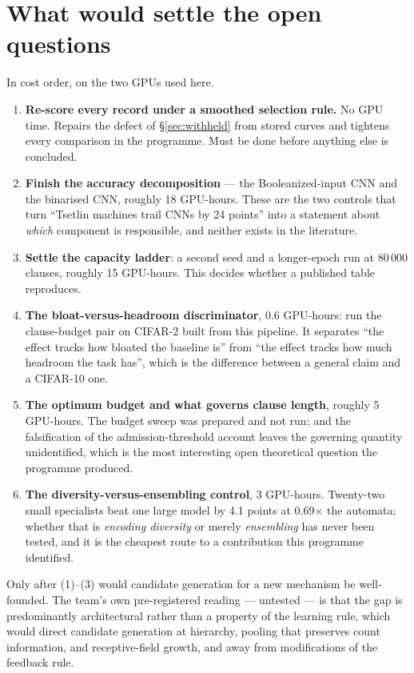 \section{What would settle the open questions}

In cost order, on the two GPUs used here.

\begin{enumerate}
\item \textbf{Re-score every record under a smoothed selection rule.} No GPU time. Repairs the defect
      of \S\ref{sec:withheld} from stored curves and tightens every comparison in the programme.
      Must be done before anything else is concluded.
\item \textbf{Finish the accuracy decomposition} --- the Booleanized-input CNN and the binarised CNN,
      roughly 18 GPU-hours. These are the two controls that turn ``Tsetlin machines trail CNNs by 24
      points'' into a statement about \emph{which} component is responsible, and neither exists in the
      literature.
\item \textbf{Settle the capacity ladder}: a second seed and a longer-epoch run at 80\,000 clauses,
      roughly 15 GPU-hours. This decides whether a published table reproduces.
\item \textbf{The bloat-versus-headroom discriminator}, 0.6 GPU-hours: run the clause-budget pair on
      CIFAR-2 built from this pipeline. It separates ``the effect tracks how bloated the baseline is''
      from ``the effect tracks how much headroom the task has'', which is the difference between a
      general claim and a CIFAR-10 one.
\item \textbf{The optimum budget and what governs clause length}, roughly 5 GPU-hours. The budget
      sweep was prepared and not run; and the falsification of the admission-threshold account leaves
      the governing quantity unidentified, which is the most interesting open theoretical question the
      programme produced.
\item \textbf{The diversity-versus-ensembling control}, 3 GPU-hours. Twenty-two small specialists beat
      one large model by 4.1 points at 0.69$\times$ the automata; whether that is \emph{encoding
      diversity} or merely \emph{ensembling} has never been tested, and it is the cheapest route to a
      contribution this programme identified.
\end{enumerate}

Only after (1)--(3) would candidate generation for a new mechanism be well-founded. The team's own
pre-registered reading --- untested --- is that the gap is predominantly architectural rather than a
property of the learning rule, which would direct candidate generation at hierarchy, pooling that
preserves count information, and receptive-field growth, and away from modifications of the feedback
rule.
